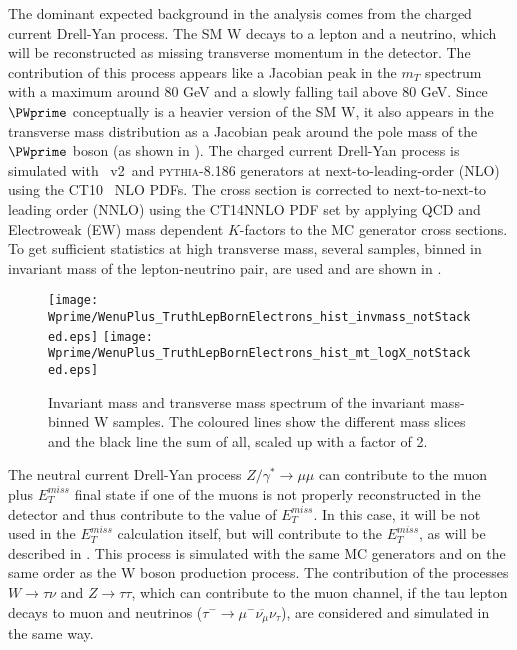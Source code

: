 The dominant expected background in the analysis comes from the charged current Drell-Yan process.
The SM W decays to a lepton and a neutrino, which will be reconstructed as missing transverse momentum in the detector.
The contribution of this process appears like a Jacobian peak in the $m_T$ spectrum
with a maximum around 80 GeV and a slowly falling tail above 80 GeV.
Since $\PWprime$ conceptually is a heavier version of the SM W, it also appears in the transverse mass distribution as a Jacobian peak around the pole mass of the $\PWprime$ boson (as shown in ). 
The charged current Drell-Yan process is simulated with \powhegbox\ v2~\cite{Alioli:2010xd}and {\scshape pythia-8.186} generators at next-to-leading-order (NLO) using the CT10~\cite{CT10} NLO PDFs. 
The cross section is corrected to next-to-next-to leading order (NNLO) using the CT14NNLO PDF set by applying QCD and Electroweak (EW) mass dependent $K$-factors to the MC generator cross sections.
To get sufficient statistics at high transverse mass, several samples, binned in invariant mass of the lepton-neutrino pair, are used and are shown in .

\begin{figure}[!htb]
  \centering
  \texttt{[image: Wprime/WenuPlus\_TruthLepBornElectrons\_hist\_invmass\_notStacked.eps]}
  \texttt{[image: Wprime/WenuPlus\_TruthLepBornElectrons\_hist\_mt\_logX\_notStacked.eps]}
  \caption{Invariant mass and transverse mass spectrum of the invariant mass-binned W samples. The coloured lines show the different mass slices and the black line
the sum of all, scaled up with a factor of 2.}
  \label{fig:wenu_notstacked}
\end{figure}

The neutral current Drell-Yan process $Z/\gamma^* \to \mu \mu$ can contribute to the muon plus $E_T^{miss}$ final state if one of the muons is not properly reconstructed in the detector and thus contribute to the value of $E_T^{miss}$. 
In this case, it will be not used in the $E_T^{miss}$ calculation itself, but will contribute to the $E_T^{miss}$, as will be described in .
This process is simulated with the same MC generators and on the same order as the W boson production process.
The contribution of the processes $W \to \tau \nu$ and $Z \to \tau \tau$, which can contribute to the muon channel, 
if the tau lepton decays to muon and neutrinos ($\tau^{-} \to \mu^{-} \overline{\nu_{\mu}} \nu_{\tau}$), are considered and simulated in the same way.

